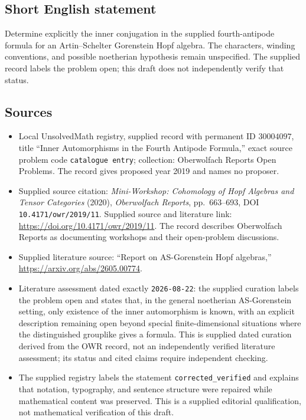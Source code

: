 \documentclass[11pt]{article}
\begin{document}
\subsection{Short English statement}
Determine explicitly the inner conjugation in the supplied fourth-antipode formula for an Artin--Schelter Gorenstein Hopf algebra. The characters, winding conventions, and possible noetherian hypothesis remain unspecified. The supplied record labels the problem open; this draft does not independently verify that status.
\subsection{Sources}
\begin{itemize}
\item Local UnsolvedMath registry, supplied record with permanent ID \(30004097\), title ``Inner Automorphisms in the Fourth Antipode Formula,'' exact source problem code \texttt{catalogue entry}; collection: Oberwolfach Reports Open Problems. The record gives proposed year 2019 and names no proposer.
\item Supplied source citation: \emph{Mini-Workshop: Cohomology of Hopf Algebras and Tensor Categories} (2020), \emph{Oberwolfach Reports}, pp.~663--693, DOI \texttt{10.4171/owr/2019/11}. Supplied source and literature link: \url{https://doi.org/10.4171/owr/2019/11}. The record describes Oberwolfach Reports as documenting workshops and their open-problem discussions.
\item Supplied literature source: ``Report on AS-Gorenstein Hopf algebras,'' \url{https://arxiv.org/abs/2605.00774}.
\item Literature assessment dated exactly \texttt{2026-08-22}: the supplied curation labels the problem open and states that, in the general noetherian AS-Gorenstein setting, only existence of the inner automorphism is known, with an explicit description remaining open beyond special finite-dimensional situations where the distinguished grouplike gives a formula. This is supplied dated curation derived from the OWR record, not an independently verified literature assessment; its status and cited claims require independent checking.
\item The supplied registry labels the statement \texttt{corrected\_verified} and explains that notation, typography, and sentence structure were repaired while mathematical content was preserved. This is a supplied editorial qualification, not mathematical verification of this draft.
\end{itemize}
\end{document}
